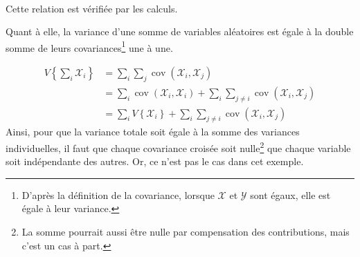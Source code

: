 \documentclass[a4paper, 12pt]{article}
\newcommand{\X}{\mathcal{X}}
\newcommand{\Y}{\mathcal{Y}}
\begin{document}
\begin{enumerate}[label=\roman*.]
\begin{align*}
	\end{align*}
	Cette relation est vérifiée par les calculs. \par
	Quant à elle, la variance d'une somme de variables aléatoires est égale à la double somme de leurs covariances\footnote{D'après la définition de la covariance, lorsque $\X$ et $\Y$ sont égaux, elle est égale à leur variance.} une à une.

	\begin{align}
		V\left\{\sum_{i} \X_i\right\} & = \sum_{i} \sum_{j} \operatorname{cov}(\X_i,\X_j)                                                           \\
		                              & = \sum_{i} \operatorname{cov}(\X_i,\X_i) + \sum_{i} \sum_{j \neq i} \operatorname{cov}(\X_i,\X_j) \nonumber \\
		                              & = \sum_{i} V\left\{\X_i\right\} + \sum_{i} \sum_{j \neq i} \operatorname{cov}(\X_i,\X_j)
	\end{align}
	Ainsi, pour que la variance totale soit égale à la somme des variances individuelles, il faut que chaque covariance croisée soit nulle\footnote{La somme pourrait aussi être nulle par compensation des contributions, mais c'est un cas à part.} \cad que chaque variable soit indépendante des autres. Or, ce n'est pas le cas dans cet exemple.
\end{enumerate}
\end{document}
